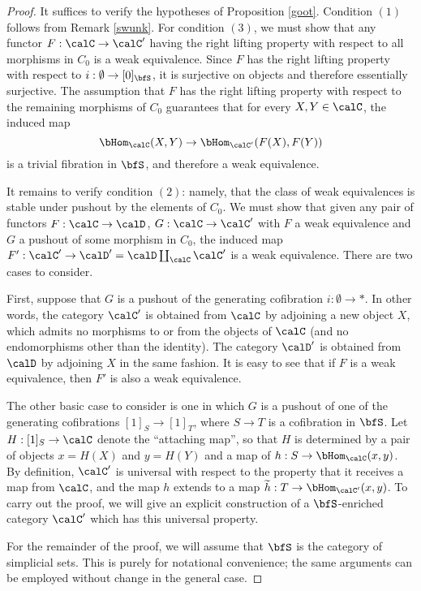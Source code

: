 \begin{proof}
It suffices to verify the hypotheses of Proposition \ref{goot}. Condition $(1)$ follows from
Remark \ref{swunk}. For condition $(3)$, we must show that any functor $F: \calC \rightarrow \calC'$ having the right lifting property with respect to all morphisms in $C_0$ is a weak equivalence. Since $F$ has the right lifting property with respect to $i: \emptyset \rightarrow [0]_{\bfS}$, it is surjective on objects and therefore essentially surjective. The assumption that $F$ has the right lifting property with respect to the remaining morphisms of $C_0$ guarantees that for every $X, Y \in \calC$, the induced map
$$\bHom_{\calC}(X,Y) \rightarrow \bHom_{\calC'}(F(X),F(Y))$$ is a trivial fibration in
$\bfS$, and therefore a weak equivalence.

It remains to verify condition $(2)$: namely, that the class of weak equivalences is stable under pushout by the elements of $C_0$. We must show that given any pair of functors
$F: \calC \rightarrow \calD$, $G: \calC \rightarrow \calC'$ with $F$ a weak equivalence and $G$ a pushout of some morphism in $C_0$, the induced map $F': \calC' \rightarrow \calD' = \calD \coprod_{\calC} \calC'$ is a weak equivalence. There are two cases to consider.

First, suppose that $G$ is a pushout of the generating cofibration $i: \emptyset \rightarrow \ast$. In other words, the category $\calC'$ is obtained from $\calC$ by adjoining a new object $X$, which admits no morphisms to or from the objects of $\calC$ (and no endomorphisms other than the identity). The category $\calD'$ is obtained from $\calD$ by adjoining $X$ in the same fashion. It is easy to see that if $F$ is a weak equivalence, then $F'$ is also a weak equivalence.

The other basic case to consider is one in which $G$ is a pushout of one of the generating cofibrations $[1]_{S} \rightarrow [1]_{T}$, where $S \rightarrow T$ is a cofibration in $\bfS$. Let $H: [1]_{S} \rightarrow \calC$
denote the ``attaching map'', so that $H$ is determined by a pair of objects $x= H(X)$ and $y=H(Y)$
and a map of $h: S \rightarrow \bHom_{\calC}(x,y)$. 
By definition, $\calC'$ is universal
with respect to the property that it receives a map from $\calC$, and the map $h$ extends to a map
$\widetilde{h}: T \rightarrow \bHom_{\calC'}(x,y)$. To carry out the proof, we will give an explicit construction of a $\bfS$-enriched category $\calC'$ which has this universal property. 

For the remainder of the proof, we will assume that $\bfS$ is the category of simplicial sets.
This is purely for notational convenience; the same arguments can be employed without
change in the general case.


\end{proof}
